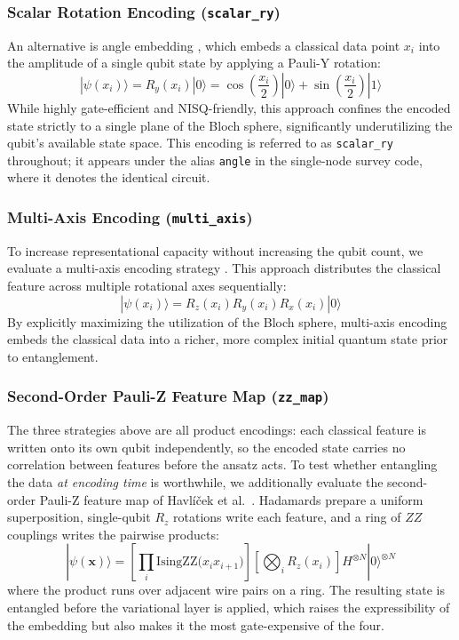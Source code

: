 \documentclass[12pt, a4paper, oneside]{report}
\begin{document}
\subsubsection{Scalar Rotation Encoding (\texttt{scalar\_ry})}
\label{sec:enc_scalar_ry}
An alternative is angle embedding \cite{angle_embedding}, which embeds a classical data point $x_i$ into the amplitude of a single qubit state by applying a Pauli-Y rotation:
\begin{equation}
    |\psi(x_i)\rangle = R_y(x_i) |0\rangle = \cos\left(\frac{x_i}{2}\right)|0\rangle + \sin\left(\frac{x_i}{2}\right)|1\rangle
\end{equation}
While highly gate-efficient and NISQ-friendly, this approach confines the encoded state strictly to a single plane of the Bloch sphere, significantly underutilizing the qubit's available state space. This encoding is referred to as \texttt{scalar\_ry} throughout; it appears under the alias \texttt{angle} in the single-node survey code, where it denotes the identical circuit.

\subsubsection{Multi-Axis Encoding (\texttt{multi\_axis})}
\label{sec:enc_multi_axis}
To increase representational capacity without increasing the qubit count, we evaluate a multi-axis encoding strategy \cite{data_reuploading}. This approach distributes the classical feature across multiple rotational axes sequentially:
\begin{equation}
    |\psi(x_i)\rangle = R_z(x_i) R_y(x_i) R_x(x_i) |0\rangle
\end{equation}
By explicitly maximizing the utilization of the Bloch sphere, multi-axis encoding embeds the classical data into a richer, more complex initial quantum state prior to entanglement.

\subsubsection{Second-Order Pauli-Z Feature Map (\texttt{zz\_map})}
\label{sec:enc_zz_map}
The three strategies above are all product encodings: each classical feature is written onto its own qubit independently, so the encoded state carries no correlation between features before the ansatz acts. To test whether entangling the data \textit{at encoding time} is worthwhile, we additionally evaluate the second-order Pauli-Z feature map of Havlíček et al.\ \cite{havlicek2019}. Hadamards prepare a uniform superposition, single-qubit $R_z$ rotations write each feature, and a ring of $ZZ$ couplings writes the pairwise products:
\begin{equation}
    |\psi(\mathbf{x})\rangle = \left[ \prod_{i} \text{IsingZZ}\big(x_i x_{i+1}\big) \right] \left[ \bigotimes_{i} R_z(x_i) \right] H^{\otimes N} |0\rangle^{\otimes N}
\end{equation}
where the product runs over adjacent wire pairs on a ring. The resulting state is entangled before the variational layer is applied, which raises the expressibility of the embedding but also makes it the most gate-expensive of the four.
\end{document}

